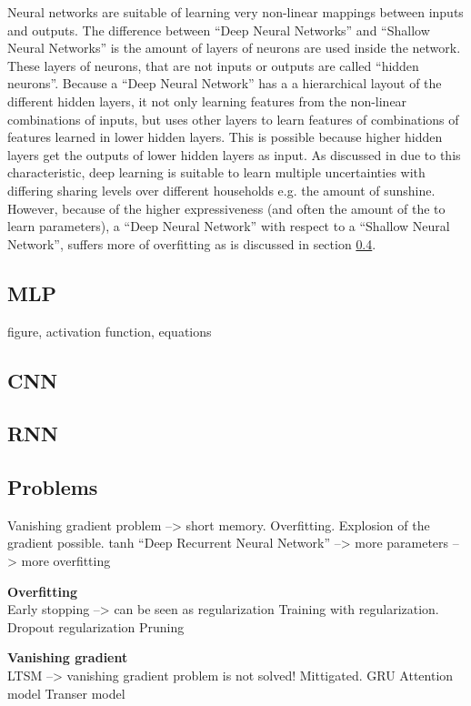 Neural networks are suitable of learning very non-linear mappings between inputs and outputs. The difference between ``Deep Neural Networks'' and ``Shallow Neural Networks'' is the amount of layers of neurons are used inside the network. These layers of neurons, that are not inputs or outputs are called ``hidden neurons''. Because a ``Deep Neural Network'' has a a hierarchical layout of the different hidden layers, it not only learning features from the non-linear combinations of inputs, but uses other layers to learn features of combinations of features learned in lower hidden layers. This is possible because higher hidden layers get the outputs of lower hidden layers as input. As discussed in  \cite{Shi2018} due to this characteristic, deep learning is suitable to learn multiple uncertainties with differing sharing levels over different households e.g. the amount of sunshine. However, because of the higher expressiveness (and often the amount of the to learn parameters), a ``Deep Neural Network'' with respect to a ``Shallow Neural Network'', suffers more of overfitting as is discussed in section \ref{s:Problems}.

\subsection{MLP}
figure, activation function, equations

\subsection{CNN}

\subsection{RNN}

\subsection{Problems}\label{s:Problems}
Vanishing gradient problem --> short memory. Overfitting. Explosion of the gradient possible. tanh 
 ``Deep Recurrent Neural Network'' --> more parameters --> more overfitting


\textbf{Overfitting}\\
Early stopping --> can be seen as regularization
Training with regularization.
Dropout regularization 
Pruning

\textbf{Vanishing gradient}\\
LTSM --> vanishing gradient problem is not solved! Mittigated. 
GRU
Attention model
Transer model



